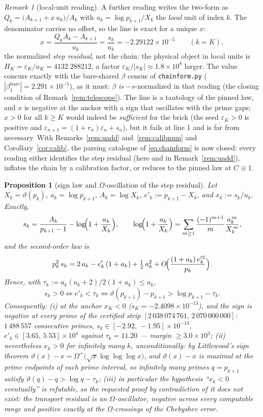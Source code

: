 \documentclass[11pt]{article}
\newtheorem{proposition}[theorem]{Proposition}
\theoremstyle{remark}
\newtheorem{remark}[theorem]{Remark}
\newcommand{\eps}{\varepsilon}
\begin{document}
\begin{remark}[local-unit reading]\label{rem:residunit}
A further reading writes the two-form as
$Q_k=\bigl(A_{k+1}+x\,u_k\bigr)/A_k$ with $u_k=\log p_{k+1}/X_k$ the
\emph{local} unit of index $k$. The denominator carries no offset, so
the line is exact for a unique $x$:
\[
x=\frac{Q_kA_k-A_{k+1}}{u_k}=\frac{s_k}{u_k}
=-2.29122\times10^{-5}\qquad(k=K),
\]
the normalized \emph{step residual}, not the chain: the physical object
in local units is $H_K=\eps_K/u_K=4132.288212$, a factor
$\eps_K/|s_K|\approx1.8\times10^{8}$ larger. The value concurs exactly
with the bare-shared $\beta$ census of
\texttt{chainform.py} ($|\beta^{\mathrm{bare}}_1|=2.291\times10^{-5}$),
as it must: $\beta$ \emph{is} $-s$-normalized in that reading (the
closing condition of Remark~\ref{rem:telescope}). The line is a
tautology of the pinned law, and $x$ is negative at the anchor with a
sign that oscillates with the prime gaps; $x>0$ for all $k\ge K$ would
indeed be \emph{sufficient} for the brick (the seed
$\eps_K>0$ is positive and $\eps_{n+1}=(1+r_n)\eps_n+s_n$), but it
fails at line 1 and is far from necessary. With
Remarks~\ref{rem:uadd} and~\ref{rem:calibnum} and
Corollary~\ref{cor:calib}, the parsing catalogue of
\eqref{eq:chainform} is now closed: every reading either identifies the
step residual (here and in Remark~\ref{rem:uadd}), inflates the chain
by a calibration factor, or reduces to the pinned law at $C\equiv1$.
\end{remark}

\begin{proposition}[sign law and $\Omega$-oscillation of the step residual]
\label{prop:soscil}
Let $X_k=\vartheta(p_k)$, $a_k=\log p_{k+1}$, $A_k=\log X_k$,
$e'_k:=p_{k+1}-X_k$, and $x_k:=s_k/u_k$. Exactly,
\[
s_k=\frac{A_k}{p_{k+1}-1}-\log\!\Bigl(1+\frac{a_k}{X_k}\Bigr),
\qquad
\log\!\Bigl(1+\frac{a_k}{X_k}\Bigr)=\sum_{m\ge1}\frac{(-1)^{m+1}}{m}
\frac{a_k^{\,m}}{X_k^{\,m}} ,
\]
and the second-order law is
\[
p_k^{2}\,s_k=2\,a_k-e'_k\,(1+a_k)+\tfrac12\,a_k^{2}
+O\!\Bigl(\frac{(1+a_k)\,e_k'^{2}}{p_k}\Bigr).
\]
Hence, with $\tau_k:=a_k(a_k+2)/2(1+a_k)\le a_k$,
\[
s_k>0\iff e'_k<\tau_k
\iff \vartheta(p_{k+1})-p_{k+1}>\log p_{k+1}-\tau_k .
\]
Consequently: (i) at the anchor $x_K<0$ ($s_K=-2.4098\times10^{-13}$),
and the sign is negative at \emph{every} prime of the certified strip
$[2\,038\,074\,761,\,2\,070\,000\,000]$: $1\,488\,557$ consecutive
primes, $s_k\in[-2.92,\,-1.95]\times10^{-13}$, $e'_k\in[3.65,\,
5.53]\times10^{4}$ against $\tau_k=11.20$ --- margin $\ge3.0\times10^{3}$;
(ii) nevertheless $x_k>0$ for \emph{infinitely many} $k$,
\emph{unconditionally}: by Littlewood's sign theorem
$\vartheta(x)-x=\Omega^{+}\bigl(\sqrt x\log\log\log x\bigr)$, and
$\vartheta(x)-x$ is maximal at the prime endpoints of each prime
interval, so infinitely many primes $q=p_{k+1}$ satisfy
$\vartheta(q)-q>\log q-\tau_k$; (iii) in particular the hypothesis
``$x_k<0$ eventually'' is refutable, so the requested proof by
contradiction of it does not exist: the transport residual is an
$\Omega$-oscillator, negative across every computable range and
positive exactly at the $\Omega$-crossings of the Chebyshev error.
\end{proposition}
\end{document}
